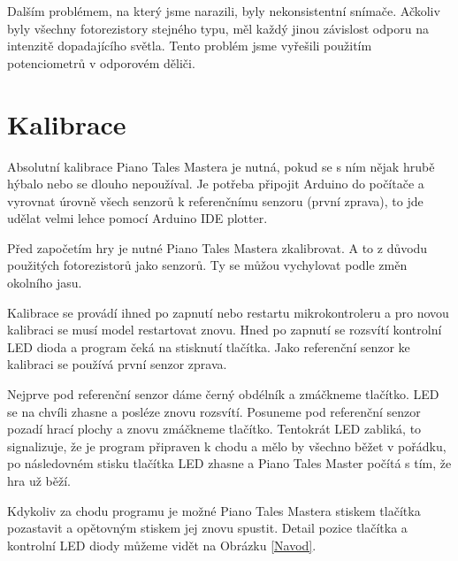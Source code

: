 \documentclass[12pt,oneside]{book} %
\begin{document}
\qquad Dalším problémem, na který jsme narazili, byly nekonsistentní snímače. Ačkoliv byly všechny fotorezistory stejného typu, měl každý jinou závislost odporu na intenzitě dopadajícího světla. Tento problém jsme vyřešili použitím potenciometrů v odporovém děliči.

\section{Kalibrace}\label{progkalib}

\qquad Absolutní kalibrace Piano Tales Mastera je nutná, pokud se s ním nějak hrubě hýbalo nebo se dlouho nepoužíval. Je potřeba připojit Arduino do počítače a vyrovnat úrovně všech senzorů k referenčnímu senzoru (první zprava), to jde udělat velmi lehce pomocí Arduino IDE plotter.

\qquad Před započetím hry je nutné Piano Tales Mastera zkalibrovat. A to z důvodu použitých fotorezistorů jako senzorů. Ty se můžou vychylovat podle změn okolního jasu. \par Kalibrace se provádí ihned po zapnutí nebo restartu mikrokontroleru a pro novou kalibraci se musí model restartovat znovu. Hned po zapnutí se rozsvítí kontrolní LED dioda a program čeká na stisknutí tlačítka. Jako referenční senzor ke kalibraci se používá první senzor zprava. \par \qquad Nejprve pod referenční senzor dáme černý obdélník a zmáčkneme tlačítko. LED se na chvíli zhasne a posléze znovu rozsvítí. Posuneme pod referenční senzor pozadí hrací plochy a znovu zmáčkneme tlačítko. Tentokrát LED zabliká, to signalizuje, že je program připraven k chodu a mělo by všechno běžet v pořádku, po následovném stisku tlačítka LED zhasne a Piano Tales Master počítá s tím, že hra už běží. \par \qquad Kdykoliv za chodu programu je možné Piano Tales Mastera stiskem tlačítka pozastavit a opětovným stiskem jej znovu spustit. Detail pozice tlačítka a kontrolní LED diody můžeme vidět na Obrázku \ref{Navod}.
\end{document}
